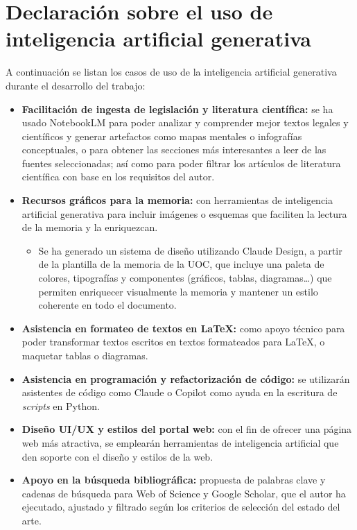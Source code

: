 \section{Declaración sobre el uso de inteligencia artificial generativa}
\label{sec:declaracion-ia}

A continuación se listan los casos de uso de la inteligencia artificial generativa durante el desarrollo del trabajo:

\begin{itemize}
    \item \textbf{Facilitación de ingesta de legislación y literatura científica:} se ha usado NotebookLM para poder analizar y comprender mejor textos legales y científicos y generar artefactos como mapas mentales o infografías conceptuales, o para obtener las secciones más interesantes a leer de las fuentes seleccionadas; así como para poder filtrar los artículos de literatura científica con base en los requisitos del autor.
    \item \textbf{Recursos gráficos para la memoria:} con herramientas de inteligencia artificial generativa para incluir imágenes o esquemas que faciliten la lectura de la memoria y la enriquezcan.
    \begin{itemize}
        \item Se ha generado un sistema de diseño utilizando Claude Design, a partir de la plantilla de la memoria de la UOC, que incluye una paleta de colores, tipografías y componentes (gráficos, tablas, diagramas\ldots) que permiten enriquecer visualmente la memoria y mantener un estilo coherente en todo el documento.
    \end{itemize}
    \item \textbf{Asistencia en formateo de textos en LaTeX:} como apoyo técnico para poder transformar textos escritos en textos formateados para LaTeX, o maquetar tablas o diagramas.
    \item \textbf{Asistencia en programación y refactorización de código:} se utilizarán asistentes de código como Claude o Copilot como ayuda en la escritura de \textit{scripts} en Python.
    \item \textbf{Diseño UI/UX y estilos del portal web:} con el fin de ofrecer una página web más atractiva, se emplearán herramientas de inteligencia artificial que den soporte con el diseño y estilos de la web.
    \item \textbf{Apoyo en la búsqueda bibliográfica:} propuesta de palabras clave y cadenas de búsqueda para Web of Science y Google Scholar, que el autor ha ejecutado, ajustado y filtrado según los criterios de selección del estado del arte.

\end{itemize}
